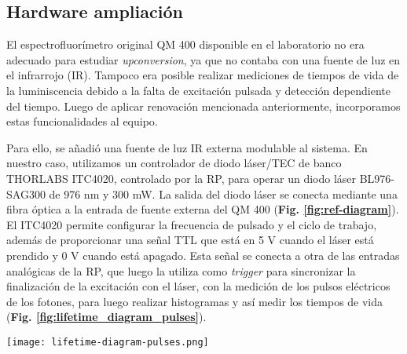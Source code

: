 
\subsection{Hardware ampliación}

El espectrofluorímetro original QM 400 disponible en el laboratorio no era adecuado para estudiar \textit{upconversion}, ya que no contaba con una fuente de luz en el infrarrojo (IR). 
Tampoco era posible realizar mediciones de tiempos de vida de la luminiscencia debido a la falta de excitación pulsada y detección dependiente del tiempo. 
Luego de aplicar renovación mencionada anteriormente, incorporamos estas funcionalidades al equipo.   

Para ello, se añadió una fuente de luz IR externa modulable al sistema. 
En nuestro caso, utilizamos un controlador de diodo láser/TEC de banco THORLABS ITC4020, controlado por la RP, para operar un diodo láser BL976-SAG300 de 976 nm y 300 mW. 
La salida del diodo láser se conecta mediante una fibra óptica a la entrada de fuente externa del QM 400 (\textbf{Fig. \ref{fig:ref-diagram}}). 
El ITC4020 permite configurar la frecuencia de pulsado y el ciclo de trabajo, además de proporcionar una señal TTL que está en 5 V cuando el láser está prendido y 0 V cuando está apagado.
Esta señal se conecta a otra de las entradas analógicas de la RP, que luego la utiliza como \textit{trigger} para sincronizar la finalización de la excitación con el láser, con la medición de los pulsos eléctricos de los fotones, para luego realizar histogramas y así medir los tiempos de vida (\textbf{Fig. \ref{fig:lifetime_diagram_pulses}}).  


\begin{SCfigure}
     \centering
     \texttt{[image: lifetime-diagram-pulses.png]}
     \caption{
    \textbf{Representacioń esquemática de un espectrofluorímetro}
    (\textbf{A}) Diagram of the Horiba PTI QuantaMaster hardware. Red arrows represent motors and limit switch connectors, black is BNC, blue is USB and orange represents a fiber optic. The path that light takes inside the spectrometer is represented in thick blue arrows. 
    (\textbf{B}) and (\textbf{C}) Representation of the old and new instrumental control module respectively.
    (\textbf{D}) Representation of the raw signal measured from the PMT detector.
    (\textbf{E}) Spectrum of the sample constructed from the raw signals measured at each wavelength.
    }
     \label{fig:lifetime_diagram_pulses}
\end{SCfigure}

